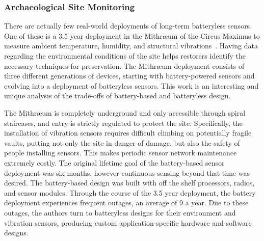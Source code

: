 \subsubsection{Archaeological Site Monitoring}
There are actually few real-world deployments of long-term batteryless sensors.
One of these is a 3.5 year deployment in the Mithræum of the Circus Maximus to measure ambient temperature, humidity, and structural vibrations~\cite{afanasov2020battery}.
Having data regarding the environmental conditions of the site helps restorers identify the necessary techniques for preservation.
The Mithræum deployment consists of three different generations of devices, starting with battery-powered sensors and evolving into a deployment of batteryless sensors.
This work is an interesting and unique analysis of the trade-offs of battery-based and batteryless design.

The Mithræum is completely underground and only accessible through spiral staircases, and entry is strictly regulated to protect the site.
Specifically, the installation of vibration sensors requires difficult climbing on potentially fragile vaults, putting not only the site in danger of damage, but also the safety of people installing sensors.
This makes periodic sensor network maintenance extremely costly.
The original lifetime goal of the battery-based sensor deployment was six months, however continuous sensing beyond that time was desired.
The battery-based design was built with off the shelf processors, radios, and sensor modules.
Through the course of the 3.5 year deployment, the battery deployment experiences frequent outages, an average of 9 a year.
Due to these outages, the authors turn to batteryless designs for their environment and vibration sensors, producing custom application-specific hardware and software designs.

